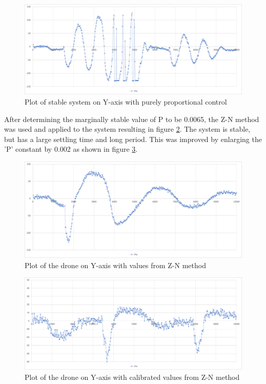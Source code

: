 \begin{figure}[h!]
    \centering
    \includegraphics[width=\textwidth]{pictures/graphs/PhiP00065.png}
    \caption{Plot of stable system on Y-axis with purely proportional control}
    \label{fig:Phi1}
\end{figure}

After determining the marginally stable value of P to be 0.0065, the Z-N method was used and applied to the system resulting in figure \ref{fig:PhiZN}. The system is stable, but has a large settling time and long period. This was improved by enlarging the 'P' constant by 0.002 as shown in figure \ref{fig:PhiZN_cal}.

\begin{figure}[h!]
    \centering
    \includegraphics[width=\textwidth]{pictures/graphs/PhiZN.png}
    \caption{Plot of the drone on Y-axis with values from Z-N method}
    \label{fig:PhiZN}
\end{figure}

\begin{figure}[h!]
    \centering
    \includegraphics[width=\textwidth]{pictures/graphs/PhiZN_cal.png}
    \caption{Plot of the drone on Y-axis with calibrated values from Z-N method}
    \label{fig:PhiZN_cal}
\end{figure}

